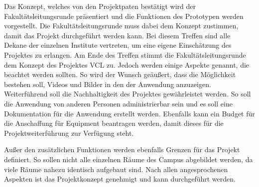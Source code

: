 Das Konzept, welches von den Projektpaten bestätigt wird der 
Fakultätsleitungsrunde präsentiert und die Funktionen des Prototypen werden vorgestellt.
Die Fakultätsleitungsrunde muss dabei dem Konzept 
zustimmen, damit das Projekt durchgeführt werden kann.
Bei diesem Treffen sind alle Dekane der einzelnen Institute vertreten, um eine eigene Einschätzung 
des Projektes zu erlangen.
Am Ende des Treffen stimmt die Fakultätsleitungsrunde dem Konzept des Projektes \acs{VCL} zu.
Jedoch werden einige Aspekte genannt, die beachtet werden sollten. So wird der Wunsch geäußert, 
dass die Möglichkeit bestehen soll, Videos und Bilder in den der Anwendung anzuzeigen.
Weiterführend soll die 
Nachhaltigkeit des Projektes gewährleistet werden. So soll die Anwendung von anderen Personen administrierbar sein und es 
soll eine Dokumentation für die Anwendung erstellt werden. Ebenfalls kann ein Budget für die Anschaffung für Equipment 
beantragen werden, damit dieses für die Projektweiterführung zur Verfügung steht.

Außer den zusätzlichen Funktionen werden ebenfalls Grenzen für das Projekt definiert. 
So sollen nicht alle einzelnen Räume 
des Campus abgebildet werden, da viele Räume nahezu identisch aufgebaut sind. 
Nach allen angesprochenen Aspekten ist das Projektkonzept genehmigt und kann durchgeführt werden.